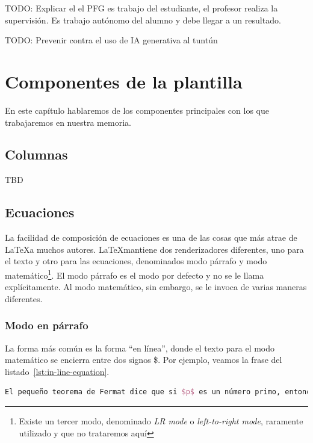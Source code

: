 \documentclass[%
    school=etsisi,%
    type=pfg,%
    degree=61CI,%
]{upm-report}
\begin{document}
TODO: Explicar el el PFG es trabajo del estudiante, el profesor realiza la supervisión. Es trabajo autónomo del alumno y debe llegar a un resultado.

TODO: Prevenir contra el uso de IA generativa al tuntún


\chapter{Componentes de la plantilla}
\label{ch:componentes-de-la-plantilla}

En este capítulo hablaremos de los componentes principales con los que trabajaremos en nuestra memoria.

\section{Columnas}

TBD

\section{Ecuaciones}

La facilidad de composición de ecuaciones es una de las cosas que más atrae de \LaTeX\space a muchos autores. \LaTeX mantiene dos renderizadores diferentes, uno para el texto y otro para las ecuaciones, denominados modo párrafo y modo matemático\footnote{Existe un tercer modo, denominado \textit{LR mode} o \textit{left-to-right mode}, raramente utilizado y que no trataremos aquí}. El modo párrafo es el modo por defecto y no se le llama explícitamente. Al modo matemático, sin embargo, se le invoca de varias maneras diferentes.

\subsection{Modo en párrafo}

La forma más común es la forma ``en línea'', donde el texto para el modo matemático se encierra entre dos signos \$. Por ejemplo, veamos la frase del listado~\ref{lst:in-line-equation}.

\begin{lstlisting}[language=tex,caption=Ejemplo de inserción de fórmulas en linea,label=lst:in-line-equation]
El pequeño teorema de Fermat dice que si $p$ es un número primo, entonces, para cada número natural $a$, con $a>0$, $a^p \equiv a (\mod p)$
\end{lstlisting}
\end{document}
